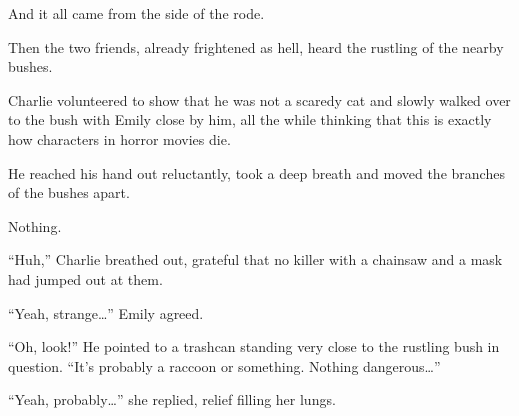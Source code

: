 And it all came from the side of the rode.

Then the two friends, already frightened as hell, heard the rustling of the nearby bushes.

Charlie volunteered to show that he was not a scaredy cat and slowly walked over to the bush with Emily close by him, all the while thinking that this is exactly how characters in horror movies die.

He reached his hand out reluctantly, took a deep breath and moved the branches of the bushes apart.

Nothing.

“Huh,” Charlie breathed out, grateful that no killer with a chainsaw and a mask had jumped out at them.

“Yeah, strange…” Emily agreed.

“Oh, look!” He pointed to a trashcan standing very close to the rustling bush in question. “It's probably a raccoon or something. Nothing dangerous…”

“Yeah, probably…” she replied, relief filling her lungs.